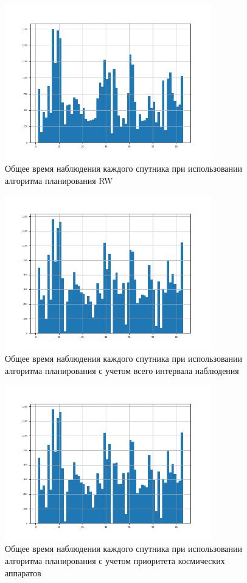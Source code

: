 \begin{figure}[H]
	\centering
	\includegraphics[width=0.8\textwidth]{assets/RW.png}
	\caption{Общее время наблюдения каждого спутника при использовании алгоритма планирования RW}
\end{figure}

\begin{figure}[H]
	\centering
	\includegraphics[width=0.8\textwidth]{assets/interv.png}
	\caption{Общее время наблюдения каждого спутника при использовании алгоритма планирования с учетом всего интервала наблюдения}
\end{figure}

\begin{figure}[H]
	\centering
	\includegraphics[width=0.8\textwidth]{assets/modif.png}
	\caption{Общее время наблюдения каждого спутника при использовании алгоритма планирования с учетом приоритета космических аппаратов}
\end{figure}

